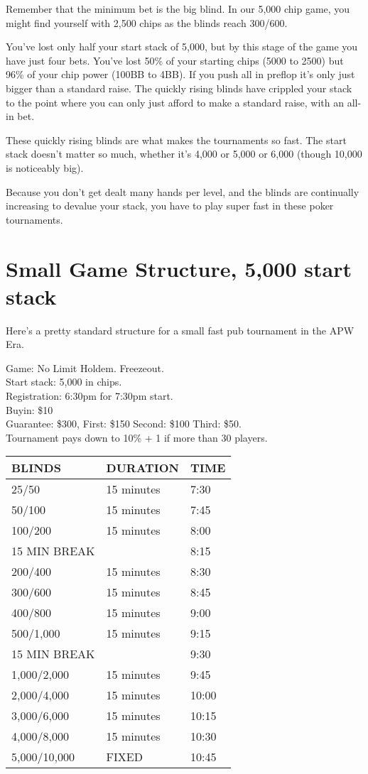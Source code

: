 Remember that the minimum bet is the big blind. In our 5,000 chip
game, you might find yourself with 2,500 chips as the blinds reach 300/600.

You've lost only half your start stack of 5,000, but by this
stage of the game you have just four bets. You've lost 50\% of your
starting chips (5000 to 2500) but 96\% of your chip power (100BB to
4BB). If you push all in preflop it's only just bigger than a standard
raise. The quickly rising blinds have crippled your stack to the point
where you can only just afford to make a standard raise, with an
all-in bet.

These quickly rising blinds are what makes the tournaments so fast.
The start stack doesn't matter so much, whether it's 4,000 or 5,000
or 6,000 (though 10,000 is noticeably big).

Because you don't get dealt many hands per level, and the blinds are
continually increasing to devalue your stack, you have to play super fast
in these poker tournaments.

\section{Small Game Structure, 5,000 start stack}

Here's a pretty standard structure for a small fast pub tournament
in the APW Era.

Game: No Limit Holdem. Freezeout. \\
Start stack: 5,000 in chips. \\
Registration: 6:30pm for 7:30pm start. \\
Buyin: \$10 \\
Guarantee: \$300, First: \$150 Second: \$100 Third: \$50. \\
Tournament pays down to 10\% + 1 if more than 30 players.

\begin{tabular}{|l|l|l|} \hline
BLINDS  &  DURATION   & TIME \\ \hline
25/50   &  15 minutes & 7:30 \\ \hline
50/100  &  15 minutes & 7:45 \\ \hline
100/200 &  15 minutes & 8:00 \\ \hline
15 MIN BREAK &        & 8:15 \\ \hline
200/400 &  15 minutes & 8:30 \\ \hline
300/600 &  15 minutes & 8:45 \\ \hline
400/800 &  15 minutes & 9:00 \\ \hline
500/1,000 & 15 minutes & 9:15 \\ \hline
15 MIN BREAK  &        & 9:30 \\ \hline
1,000/2,000 & 15 minutes & 9:45 \\ \hline
2,000/4,000 & 15 minutes & 10:00 \\ \hline
3,000/6,000 & 15 minutes & 10:15 \\ \hline
4,000/8,000 & 15 minutes & 10:30 \\ \hline
5,000/10,000 & FIXED & 10:45 \\ \hline
\end{tabular}

